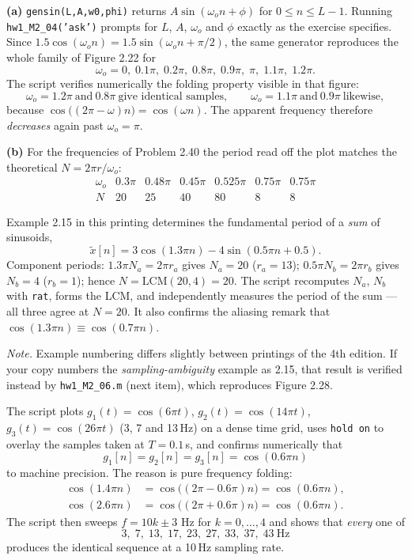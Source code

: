 
\textbf{(a)} \texttt{gensin(L,A,w0,phi)} returns $A\sin(\omega_o n+\phi)$ for $0\le n\le L-1$.
Running \texttt{hw1\_M2\_04('ask')} prompts for $L$, $A$, $\omega_o$ and $\phi$ exactly as the
exercise specifies. Since $1.5\cos(\omega_o n)=1.5\sin(\omega_o n+\pi/2)$, the same generator
reproduces the whole family of Figure 2.22 for
\[
\omega_o=0,\;0.1\pi,\;0.2\pi,\;0.8\pi,\;0.9\pi,\;\pi,\;1.1\pi,\;1.2\pi .
\]
The script verifies numerically the folding property visible in that figure:
\[
\omega_o=1.2\pi\ \text{and}\ 0.8\pi\ \text{give identical samples},\qquad
\omega_o=1.1\pi\ \text{and}\ 0.9\pi\ \text{likewise},
\]
because $\cos\bigl((2\pi-\omega)n\bigr)=\cos(\omega n)$. The apparent frequency therefore
\emph{decreases} again past $\omega_o=\pi$.

\textbf{(b)} For the frequencies of Problem 2.40 the period read off the plot matches the
theoretical $N=2\pi r/\omega_o$:
\[
\begin{array}{lcccccc}
\omega_o & 0.3\pi & 0.48\pi & 0.45\pi & 0.525\pi & 0.75\pi & 0.75\pi\\\hline
N & 20 & 25 & 40 & 80 & 8 & 8
\end{array}
\]


Example 2.15 in this printing determines the fundamental period of a \emph{sum} of sinusoids,
\[
\tilde{x}[n]=3\cos(1.3\pi n)-4\sin(0.5\pi n+0.5).
\]
Component periods: $1.3\pi N_a=2\pi r_a$ gives $N_a=20$ ($r_a=13$); $0.5\pi N_b=2\pi r_b$ gives
$N_b=4$ ($r_b=1$); hence $N=\mathrm{LCM}(20,4)=20$. The script recomputes $N_a$, $N_b$ with
\texttt{rat}, forms the LCM, and independently measures the period of the sum --- all three
agree at $N=20$. It also confirms the aliasing remark that
$\cos(1.3\pi n)\equiv\cos(0.7\pi n)$.

\smallskip
\emph{Note.} Example numbering differs slightly between printings of the 4th edition. If your
copy numbers the \emph{sampling-ambiguity} example as 2.15, that result is verified instead by
\texttt{hw1\_M2\_06.m} (next item), which reproduces Figure 2.28.


The script plots $g_1(t)=\cos(6\pi t)$, $g_2(t)=\cos(14\pi t)$, $g_3(t)=\cos(26\pi t)$ (3, 7 and
13\,Hz) on a dense time grid, uses \texttt{hold on} to overlay the samples taken at
$T=0.1$\,s, and confirms numerically that
\[
g_1[n]=g_2[n]=g_3[n]=\cos(0.6\pi n)
\]
to machine precision. The reason is pure frequency folding:
\[
\begin{aligned}
\cos(1.4\pi n)&=\cos\bigl((2\pi-0.6\pi)n\bigr)=\cos(0.6\pi n),\\
\cos(2.6\pi n)&=\cos\bigl((2\pi+0.6\pi)n\bigr)=\cos(0.6\pi n).
\end{aligned}
\]
The script then sweeps $f=10k\pm3$ Hz for $k=0,\dots,4$ and shows that \emph{every} one of
\[
3,\;7,\;13,\;17,\;23,\;27,\;33,\;37,\;43\ \text{Hz}
\]
produces the identical sequence at a 10\,Hz sampling rate.

